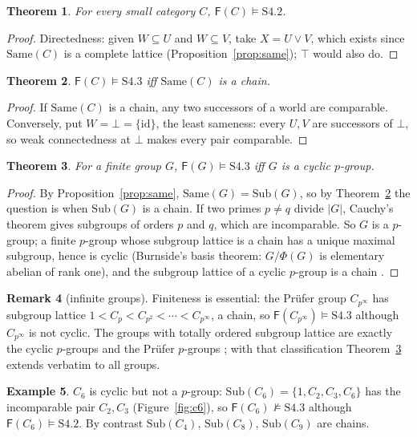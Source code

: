 \documentclass[11pt]{amsart}
\newtheorem{thm}{Theorem}[section]
\theoremstyle{definition}
\newtheorem{rem}[thm]{Remark}
\newtheorem{ex}[thm]{Example}
\newcommand{\Same}{\mathrm{Same}}
\newcommand{\Sub}{\mathrm{Sub}}
\newcommand{\Fr}{\mathsf{F}}
\begin{document}
\begin{thm}\label{thm:s42}
For every small category $C$, $\Fr(C)\models\mathrm{S4.2}$.
\end{thm}
\begin{proof}
Directedness: given $W\subseteq U$ and $W\subseteq V$, take $X=U\vee V$, which
exists since $\Same(C)$ is a complete lattice (Proposition~\ref{prop:same});
$\top$ would also do.
\end{proof}

\begin{thm}\label{thm:s43}
$\Fr(C)\models\mathrm{S4.3}$ iff $\Same(C)$ is a chain.
\end{thm}
\begin{proof}
If $\Same(C)$ is a chain, any two successors of a world are comparable.
Conversely, put $W=\bot=\{\mathrm{id}\}$, the least sameness: every $U,V$ are
successors of $\bot$, so weak connectedness at $\bot$ makes every pair
comparable.
\end{proof}

\begin{thm}\label{thm:group}
For a \emph{finite} group $G$, $\Fr(G)\models\mathrm{S4.3}$ iff $G$ is a cyclic
$p$-group.
\end{thm}
\begin{proof}
By Proposition~\ref{prop:same}, $\Same(G)=\Sub(G)$, so by
Theorem~\ref{thm:s43} the question is when $\Sub(G)$ is a chain. If two primes
$p\ne q$ divide $|G|$, Cauchy's theorem gives subgroups of orders $p$ and $q$,
which are incomparable. So $G$ is a $p$-group; a finite $p$-group whose subgroup
lattice is a chain has a unique maximal subgroup, hence is cyclic (Burnside's
basis theorem: $G/\Phi(G)$ is elementary abelian of rank one), and the subgroup
lattice of a cyclic $p$-group is a chain \cite{Schmidt}.
\end{proof}

\begin{rem}[infinite groups]
Finiteness is essential: the Pr\"ufer group $C_{p^\infty}$ has subgroup
lattice $1<C_p<C_{p^2}<\cdots<C_{p^\infty}$, a chain, so
$\Fr(C_{p^\infty})\models\mathrm{S4.3}$ although $C_{p^\infty}$ is not cyclic.
The groups with totally ordered subgroup lattice are exactly the cyclic
$p$-groups and the Pr\"ufer $p$-groups \cite{Schmidt}; with that classification
Theorem~\ref{thm:group} extends verbatim to all groups.
\end{rem}

\begin{ex}\label{ex:c6}
$C_6$ is cyclic but not a $p$-group: $\Sub(C_6)=\{1,C_2,C_3,C_6\}$ has the
incomparable pair $C_2,C_3$ (Figure~\ref{fig:c6}), so $\Fr(C_6)\not\models
\mathrm{S4.3}$ although $\Fr(C_6)\models\mathrm{S4.2}$. By contrast
$\Sub(C_4)$, $\Sub(C_8)$, $\Sub(C_9)$ are chains.
\end{ex}
\end{document}
